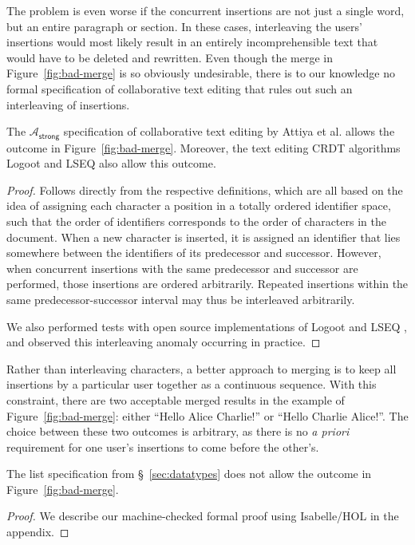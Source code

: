 The problem is even worse if the concurrent insertions are not just a single word, but an entire paragraph or section.
In these cases, interleaving the users' insertions would most likely result in an entirely incomprehensible text that would have to be deleted and rewritten.
Even though the merge in Figure~\ref{fig:bad-merge} is so obviously undesirable, there is to our knowledge no formal specification of collaborative text editing that rules out such an interleaving of insertions.

\begin{proposition}\label{prop:attiya-allows-interleaving}
    The $\mathcal{A}_\textsf{strong}$ specification of collaborative text editing by Attiya et al. \cite{Attiya:2016kh} allows the outcome in Figure~\ref{fig:bad-merge}.
    Moreover, the text editing CRDT algorithms Logoot \cite{Weiss:2009ht,Weiss:2010hx} and LSEQ \cite{Nedelec:2013ky,Nedelec:2016eo} also allow this outcome.
\end{proposition}
\begin{proof}
    Follows directly from the respective definitions, which are all based on the idea of assigning each character a position in a totally ordered identifier space, such that the order of identifiers corresponds to the order of characters in the document.
    When a new character is inserted, it is assigned an identifier that lies somewhere between the identifiers of its predecessor and successor.
    However, when concurrent insertions with the same predecessor and successor are performed, those insertions are ordered arbitrarily.
    Repeated insertions within the same predecessor-successor interval may thus be interleaved arbitrarily.

    We also performed tests with open source implementations of Logoot \cite{AhmedNacer:2011ke,ReplicationBenchmark} and LSEQ \cite{LSEQTree,Nedelec:2016eo}, and observed this interleaving anomaly occurring in practice.
\end{proof}

Rather than interleaving characters, a better approach to merging is to keep all insertions by a particular user together as a continuous sequence.
With this constraint, there are two acceptable merged results in the example of Figure~\ref{fig:bad-merge}: either ``Hello Alice Charlie!'' or ``Hello Charlie Alice!''.
The choice between these two outcomes is arbitrary, as there is no \emph{a priori} requirement for one user's insertions to come before the other's.

\begin{proposition}\label{prop:no-interleaving}
    The list specification from \S~\ref{sec:datatypes} does not allow the outcome in Figure~\ref{fig:bad-merge}.
\end{proposition}
\begin{proof}
    We describe our machine-checked formal proof using Isabelle/HOL in the appendix.
\end{proof}

